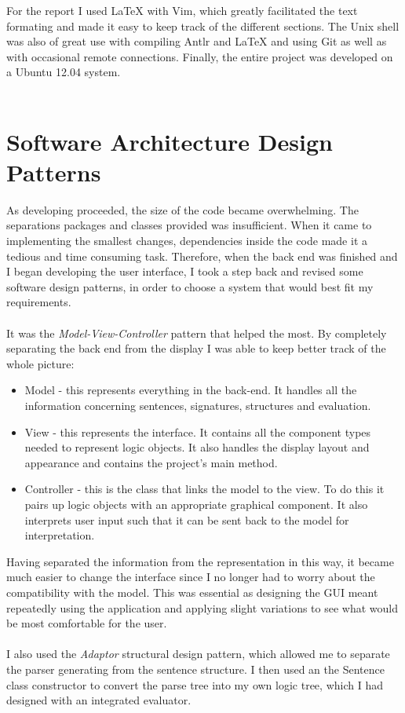 \documentclass{report}
\begin{document}
For the report I used LaTeX with Vim, which greatly facilitated the text formating and made it easy to keep track of the different sections. The Unix shell was also of great use with compiling Antlr and LaTeX and using Git as well as with occasional remote connections. Finally, the entire project was developed on a Ubuntu 12.04 system. \\ \\

\section{Software Architecture Design Patterns}
As developing proceeded, the size of the code became overwhelming. The separations packages and classes provided was insufficient. When it came to implementing the smallest changes, dependencies inside the code made it a tedious and time consuming task. Therefore, when the back end was finished and I began developing the user interface, I took a step back and revised some software design patterns, in order to choose a system that would best fit my requirements. \\ \\
It was the \emph{Model-View-Controller} pattern that helped the most. By completely separating the back end from the display I was able to keep better track of the whole picture:
\begin{itemize}
\item Model - this represents everything in the back-end. It handles all the information concerning sentences, signatures, structures and evaluation. 
\item View - this represents the interface. It contains all the component types needed to represent logic objects. It also handles the display layout and appearance and contains the project's main method.
\item Controller - this is the class that links the model to the view. To do this it pairs up logic objects with an appropriate graphical component. It also interprets user input such that it can be sent back to the model for interpretation. 
\end{itemize}
Having separated the information from the representation in this way, it became much easier to change the interface since I no longer had to worry about the compatibility with the model. This was essential as designing the GUI meant repeatedly using the application and applying slight variations to see what would be most comfortable for the user. \\ \\
I also used the \emph{Adaptor} structural design pattern, which allowed me to separate the parser generating from the sentence structure. I then used an the Sentence class constructor to convert the parse tree into my own logic tree, which I had designed with an integrated evaluator. \\ \\
\end{document}
